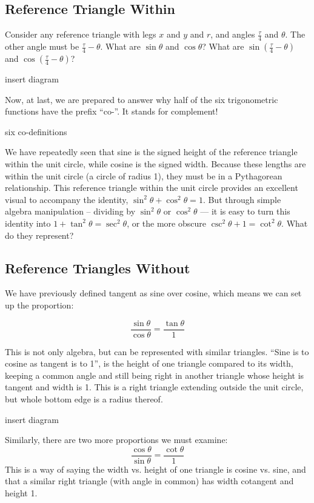 
\subsection{Reference Triangle Within}
Consider any reference triangle with legs $x$ and $y$ and $r$, and angles $\frac{\tau}{4}$
and $\theta$.  The other angle must be $\frac{\tau}{4} - \theta$.  What are $\sin\theta$ and
$\cos\theta$?  What are $\sin(\frac{\tau}{4}-\theta)$ and $\cos(\frac{\tau}{4}-\theta)$?

insert diagram

Now, at last, we are prepared to answer why half of the six trigonometric functions have the
prefix ``co-''.  It stands for complement!

six co-definitions


We have repeatedly seen that sine is the signed height of the reference triangle within the unit
circle, while cosine is the signed width.  Because these lengths are within the unit circle (a
circle of radius 1), they must be in a Pythagorean relationship.  This reference triangle within 
the unit circle provides an excellent visual to accompany the identity, $\sin^2\theta+\cos^2\theta
= 1$.  But through simple algebra manipulation -- dividing by $\sin^2\theta$ or $\cos^2\theta$ ---
it is easy to turn this identity into $1 + \tan^2\theta = \sec^2\theta$, or the more obscure
$\csc^2\theta + 1 = \cot^2\theta$.  What do they represent?

\subsection{Reference Triangles Without}
We have previously defined tangent as sine over cosine, which means we can set up the proportion:

\begin{equation}
\frac{\sin\theta}{\cos\theta} = \frac{\tan\theta}{1}
\end{equation}

This is not only algebra, but can be represented with similar triangles.  ``Sine is to cosine as tangent is to
1'', is the height of one triangle compared to its width, keeping a common angle and still being right in
another triangle whose height is tangent and width is 1.  This is a right triangle extending outside
the unit circle, but whole bottom edge is a radius thereof.

insert diagram

Similarly, there are two more proportions we must examine:
\begin{equation}
\frac{\cos\theta}{\sin\theta} = \frac{\cot\theta}{1}
\end{equation}
This is a way of saying the width vs. height of one triangle is cosine vs. sine, and that a similar right
triangle (with angle in common) has width cotangent and height 1.  

